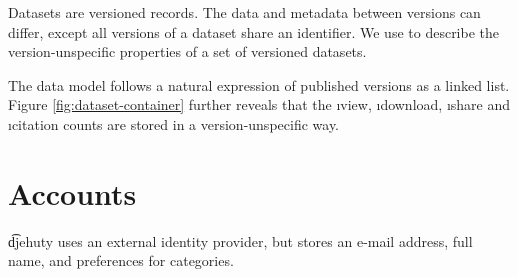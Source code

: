 
  Datasets are versioned records.  The data and metadata between versions
  can differ, except all versions of a dataset share an identifier.  We use
   to describe the version-unspecific properties
  of a set of versioned datasets.


  The data model follows a natural expression of published versions as a
  linked list.  Figure \ref{fig:dataset-container} further reveals that
  the \i{view}, \i{download}, \i{share} and \i{citation} counts are stored
  in a version-unspecific way.

\section{Accounts}

  \t{djehuty} uses an external identity provider, but stores an e-mail address,
  full name, and preferences for categories.


